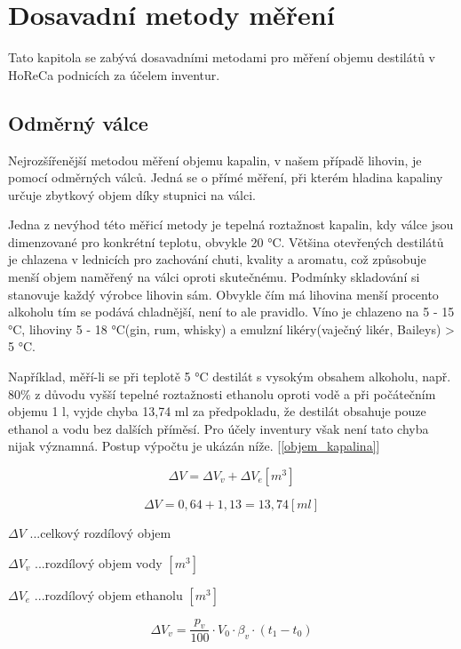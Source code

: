 \chapter{Dosavadní metody měření}
\label{Dosavadní metody měření}
Tato kapitola se zabývá dosavadními metodami pro měření objemu destilátů v HoReCa podnicích za účelem inventur.

\section{Odměrný válce}
\label{Dosavadní metody měření - valce}
Nejrozšířenější metodou měření objemu kapalin, v našem případě lihovin, je pomocí odměrných válců. Jedná se o přímé měření, při kterém hladina kapaliny určuje zbytkový objem díky stupnici na válci.

Jedna z nevýhod této měřicí metody je tepelná roztažnost kapalin, kdy válce jsou
dimenzované pro konkrétní teplotu, obvykle 20 °C. Většina otevřených destilátů je chlazena v lednicích pro zachování chuti, kvality a aromatu, což způsobuje menší objem naměřený na válci oproti skutečnému. Podmínky skladování si stanovuje každý výrobce lihovin sám. Obvykle čím má lihovina menší procento alkoholu tím se podává chladnější, není to ale pravidlo. Víno je chlazeno na 5 - 15 °C, lihoviny 5 - 18 °C(gin, rum, whisky) a emulzní likéry(vaječný likér, Baileys) > 5 °C. 

Například, měří-li se při teplotě 5 °C destilát s vysokým obsahem alkoholu, např. 80\% z důvodu vyšší tepelné roztažnosti ethanolu oproti vodě a při počátečním objemu 1 l, vyjde chyba 13,74 ml za předpokladu, že destilát obsahuje pouze ethanol a vodu bez dalších příměsí. Pro účely inventury však není tato chyba nijak významná. Postup výpočtu je ukázán níže. [\ref{objem_kapalina}]

\begin{equation}
\label{objem_kapalina}
    \Delta V = \Delta V_v + \Delta V_e \left[m^3\right]
\end{equation}


\[\Delta V = 0,64 + 1,13 = 13,74 \left[ml\right]\]


\(\Delta V\) ...celkový rozdílový objem

\(\Delta V_{v}\) ...rozdílový objem vody \([m^3]\)

\(\Delta V_{e}\) ...rozdílový objem ethanolu \([m^3]\)


\begin{equation}
    \Delta V_v = \frac{p_v}{100} \cdot V_0 \cdot \beta_v \cdot (t_1 - t_0)
\end{equation}

